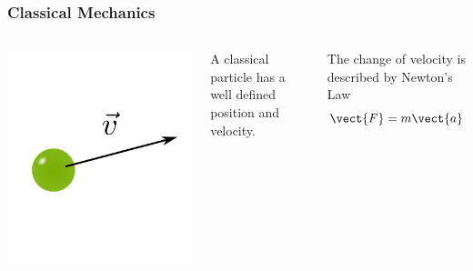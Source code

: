 \documentclass{beamer}
\begin{document}
\begin{frame}
	\frametitle{Classical Mechanics}

	\begin{columns}
			\includegraphics[width=\textwidth]{figurer/classical_particle_2}

			A classical particle has a well defined position and velocity.
			\vspace{0.5cm}


			The change of velocity is described by Newton's Law
			\begin{equation*}
				\vect{F} = m \vect{a}
			\end{equation*}
	\end{columns}
\end{frame}

%
\end{document}
